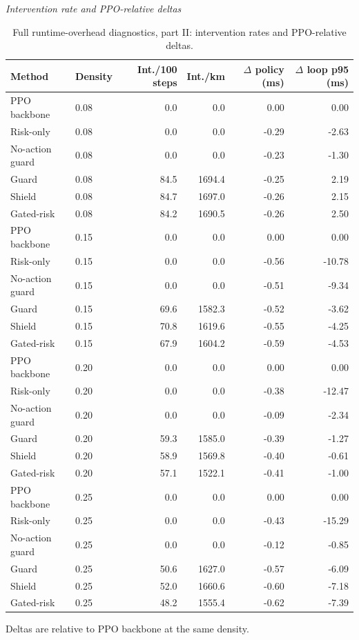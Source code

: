 \begin{table}[!htbp]
\centering
\caption{Full runtime-overhead diagnostics, part II: intervention rates and PPO-relative deltas.}
\label{tab_runtime_delta}
\tiny
\setlength{\tabcolsep}{3.2pt}
\renewcommand{\arraystretch}{1.04}
\textit{Intervention rate and PPO-relative deltas}\par
\begin{tabular}{@{}llrrrr@{}}
\toprule
Method & Density & Int./100 steps & Int./km & $\Delta$ policy (ms) & $\Delta$ loop p95 (ms) \\
\midrule
PPO backbone & 0.08 & 0.0 & 0.0 & 0.00 & 0.00 \\
Risk-only & 0.08 & 0.0 & 0.0 & -0.29 & -2.63 \\
No-action guard & 0.08 & 0.0 & 0.0 & -0.23 & -1.30 \\
Guard & 0.08 & 84.5 & 1694.4 & -0.25 & 2.19 \\
Shield & 0.08 & 84.7 & 1697.0 & -0.26 & 2.15 \\
Gated-risk & 0.08 & 84.2 & 1690.5 & -0.26 & 2.50 \\
PPO backbone & 0.15 & 0.0 & 0.0 & 0.00 & 0.00 \\
Risk-only & 0.15 & 0.0 & 0.0 & -0.56 & -10.78 \\
No-action guard & 0.15 & 0.0 & 0.0 & -0.51 & -9.34 \\
Guard & 0.15 & 69.6 & 1582.3 & -0.52 & -3.62 \\
Shield & 0.15 & 70.8 & 1619.6 & -0.55 & -4.25 \\
Gated-risk & 0.15 & 67.9 & 1604.2 & -0.59 & -4.53 \\
PPO backbone & 0.20 & 0.0 & 0.0 & 0.00 & 0.00 \\
Risk-only & 0.20 & 0.0 & 0.0 & -0.38 & -12.47 \\
No-action guard & 0.20 & 0.0 & 0.0 & -0.09 & -2.34 \\
Guard & 0.20 & 59.3 & 1585.0 & -0.39 & -1.27 \\
Shield & 0.20 & 58.9 & 1569.8 & -0.40 & -0.61 \\
Gated-risk & 0.20 & 57.1 & 1522.1 & -0.41 & -1.00 \\
PPO backbone & 0.25 & 0.0 & 0.0 & 0.00 & 0.00 \\
Risk-only & 0.25 & 0.0 & 0.0 & -0.43 & -15.29 \\
No-action guard & 0.25 & 0.0 & 0.0 & -0.12 & -0.85 \\
Guard & 0.25 & 50.6 & 1627.0 & -0.57 & -6.09 \\
Shield & 0.25 & 52.0 & 1660.6 & -0.60 & -7.18 \\
Gated-risk & 0.25 & 48.2 & 1555.4 & -0.62 & -7.39 \\
\bottomrule
\end{tabular}
\begin{tablenotes}
\item Deltas are relative to PPO backbone at the same density.
\end{tablenotes}
\end{table}
